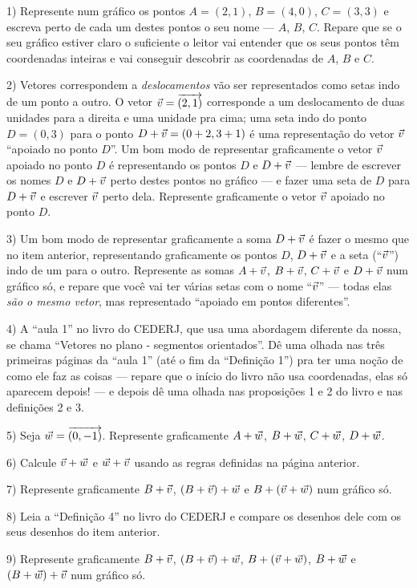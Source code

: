 \documentclass[oneside]{book}
\begin{document}
1) Represente num gráfico os pontos $A=(2,1)$, $B=(4,0)$, $C=(3,3)$ e
escreva perto de cada um destes pontos o seu nome --- $A$, $B$, $C$.
Repare que se o seu gráfico estiver claro o suficiente o leitor vai
entender que os seus pontos têm coordenadas inteiras e vai conseguir
descobrir as coordenadas de $A$, $B$ e $C$.

2) Vetores correspondem a {\sl deslocamentos} vão ser representados
como setas indo de um ponto a outro. O vetor ${\vec v}={\overrightarrow{(2,1)}}$
corresponde a um deslocamento de duas unidades para a direita e uma
unidade pra cima; uma seta indo do ponto $D=(0,3)$ para o ponto
$D+{\vec v}=(0+2,3+1)$ é uma representação do vetor ${\vec v}$ ``apoiado no
ponto $D$''. Um bom modo de representar graficamente o vetor ${\vec v}$
apoiado no ponto $D$ é representando os pontos $D$ e $D+{\vec v}$ ---
lembre de escrever os nomes $D$ e $D+{\vec v}$ perto destes pontos no
gráfico --- e fazer uma seta de $D$ para $D+{\vec v}$ e escrever ${\vec v}$
perto dela. Represente graficamente o vetor ${\vec v}$ apoiado no ponto
$D$.

3) Um bom modo de representar graficamente a soma $D+{\vec v}$ é fazer o
mesmo que no item anterior, representando graficamente os pontos $D$,
$D+{\vec v}$ e a seta (``${\vec v}$'') indo de um para o outro. Represente as
somas $A+{\vec v}$, $B+{\vec v}$, $C+{\vec v}$ e $D+{\vec v}$ num gráfico só, e repare que
você vai ter várias setas com o nome ``${\vec v}$'' --- todas elas {\sl são
  o mesmo vetor}, mas representado ``apoiado em pontos diferentes''.

4) A ``aula 1'' no livro do CEDERJ, que usa uma abordagem diferente da
nossa, se chama ``Vetores no plano - segmentos orientados''. Dê uma
olhada nas três primeiras páginas da ``aula 1'' (até o fim da
``Definição 1'') pra ter uma noção de como ele faz as coisas ---
repare que o início do livro não usa coordenadas, elas só aparecem
depois! --- e depois dê uma olhada nas proposições 1 e 2 do livro e
nas definições 2 e 3.

5) Seja ${\vec w}={\overrightarrow{(0,-1)}}$. Represente graficamente $A+{\vec w}$, $B+{\vec w}$,
$C+{\vec w}$, $D+{\vec w}$.

6) Calcule ${\vec v}+{\vec w}$ e ${\vec w}+{\vec v}$ usando as regras definidas na página
anterior.

7) Represente graficamente $B+{\vec v}$, $(B+{\vec v})+{\vec w}$ e $B+({\vec v}+{\vec w})$ num
gráfico só.

8) Leia a ``Definição 4'' no livro do CEDERJ e compare os desenhos
dele com os seus desenhos do item anterior.

9) Represente graficamente $B+{\vec v}$, $(B+{\vec v})+{\vec w}$, $B+({\vec v}+{\vec w})$,
$B+{\vec w}$ e $(B+{\vec w})+{\vec v}$ num gráfico só.
\end{document}
